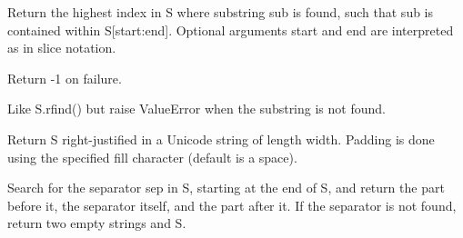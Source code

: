 \documentclass[letterpaper,10pt,english]{sphinxmanual}
\begin{document}
\begin{fulllineitems}
\begin{fulllineitems}
\end{fulllineitems}


\begin{fulllineitems}
\label{api_reference:textblob_de.blob.Word.rfind}
Return the highest index in S where substring sub is found,
such that sub is contained within S{[}start:end{]}.  Optional
arguments start and end are interpreted as in slice notation.

Return -1 on failure.

\end{fulllineitems}


\begin{fulllineitems}
\label{api_reference:textblob_de.blob.Word.rindex}
Like S.rfind() but raise ValueError when the substring is not found.

\end{fulllineitems}


\begin{fulllineitems}
\label{api_reference:textblob_de.blob.Word.rjust}
Return S right-justified in a Unicode string of length width. Padding is
done using the specified fill character (default is a space).

\end{fulllineitems}


\begin{fulllineitems}
\label{api_reference:textblob_de.blob.Word.rpartition}
Search for the separator sep in S, starting at the end of S, and return
the part before it, the separator itself, and the part after it.  If the
separator is not found, return two empty strings and S.

\end{fulllineitems}


\end{fulllineitems}
\end{document}
